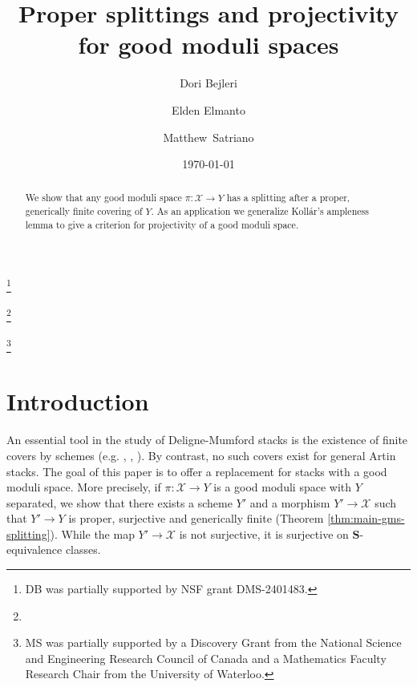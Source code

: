 \documentclass{amsart}
\theoremstyle{definition}
\newcommand{\cX}{\mathcal{X}}
\begin{document}
	
	\title{Proper splittings and projectivity for good moduli spaces}
	
	\author{Dori Bejleri}
	\thanks{DB was partially supported by NSF grant DMS-2401483.}
	\address[DB]{Department of Mathematics, University of Maryland, College Park MD 20742, USA}
	
	\author{Elden Elmanto}
	\thanks{}
	\address[EE]{Department of Mathematics, University of Toronto, Toronto ON M5S2E4, Canada}
	
	\author{Matthew~Satriano}
	\thanks{MS was partially supported by a Discovery Grant from the
		National Science and Engineering Research Council of Canada and a Mathematics Faculty Research Chair from the University of Waterloo.}
	\address[MS]{Department of Pure Mathematics, University
		of Waterloo, Waterloo ON N2L3G1, Canada}
	
	\date{\today}
	\keywords{}
	\subjclass[2020]{}
	
	
	\begin{abstract} We show that any good moduli space $\pi \colon \cX \to Y$ has a splitting after a proper, generically finite covering of $Y$. As an application we generalize Koll\'ar's ampleness lemma to give a criterion for projectivity of a good moduli space. 
	\end{abstract}
	
	\maketitle
	
	
	
	
	\section{Introduction}
	\label{sec:intro}
	
	An essential tool in the study of Deligne-Mumford stacks is the existence of finite covers by schemes (e.g. \cite[Theorem 16.6]{LMB}, \cite[Theorem 2.7]{EHKV}, \cite{Olsson2005}). By contrast, no such covers exist for general Artin stacks. The goal of this paper is to offer a replacement for stacks with a good moduli space.  More precisely, if $\pi \colon \cX \to Y$ is a good moduli space with $Y$ separated, we show that there exists a scheme $Y'$ and a morphism $Y' \to \cX$ such that $Y' \to Y$ is proper, surjective and generically finite (Theorem \ref{thm:main-gms-splitting}). While the map $Y' \to \cX$ is not surjective, it is surjective on $\textbf{S}$-equivalence classes. 
	
\end{document}
